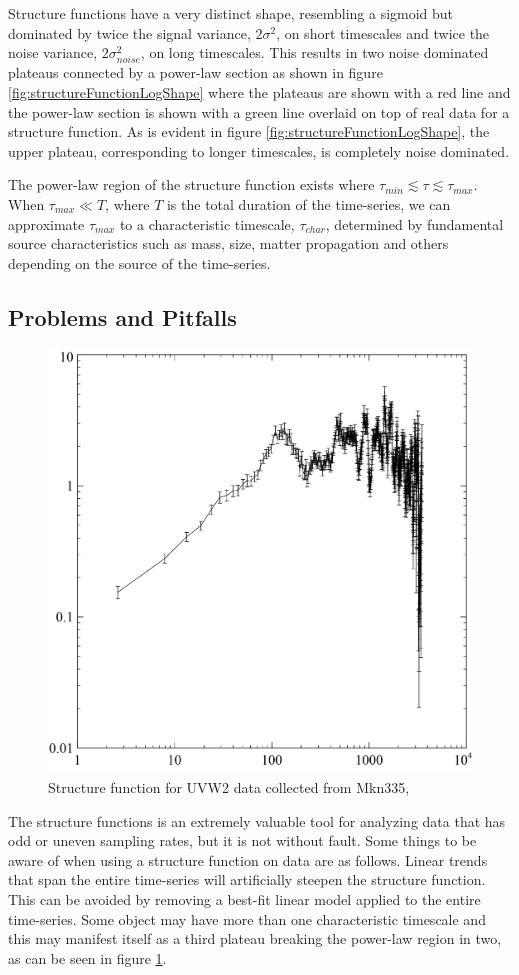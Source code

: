 \documentclass[12pt, oneside]{smuthesis}
\begin{document}
Structure functions have a very distinct shape, resembling a sigmoid but dominated by twice the signal variance, $2\sigma^{2}$, on short timescales and twice the noise variance, $2\sigma_{noise}^{2}$, on long timescales. This results in two noise dominated plateaus connected by a power-law section as shown in figure \ref{fig:structureFunctionLogShape} where the plateaus are shown with a red line and the power-law section is shown with a green line overlaid on top of real data for a structure function. As is evident in figure \ref{fig:structureFunctionLogShape}, the upper plateau, corresponding to longer timescales, is completely noise dominated.

The power-law region of the structure function exists where $\tau_{min}\lesssim\tau\lesssim\tau_{max}$. When $\tau_{max}\ll T$, where $T$ is the total duration of the time-series, we can approximate $\tau_{max}$ to a characteristic timescale, $\tau_{char}$, determined by fundamental source characteristics such as mass, size, matter propagation and others depending on the source of the time-series.

\subsection{\sc Problems and Pitfalls} \label{problemsAndPitfalls}

\begin{figure}[H]
	\centering
	\includegraphics[width=0.4\linewidth]{mkn335UVW2SF}
	\caption{Structure function for UVW2 data collected from Mkn335, \cite{galloblue}}
	\label{fig:mkn335UVW2SF}
\end{figure}

The structure functions is an extremely valuable tool for analyzing data that has odd or uneven sampling rates, but it is not without fault. Some things to be aware of when using a structure function on data are as follows. Linear trends that span the entire time-series will artificially steepen the structure function. This can be avoided by removing a best-fit linear model applied to the entire time-series. Some object may have more than one characteristic timescale and this may manifest itself as a third plateau breaking the power-law region in two, as can be seen in figure \ref{fig:mkn335UVW2SF}.
\end{document}
